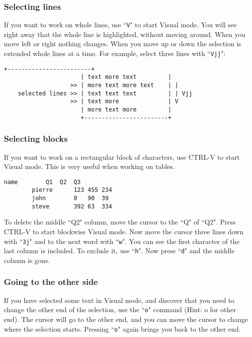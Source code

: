 \subsubsection{Selecting lines}

If you want to work on whole lines, use ``\texttt{V}" to start Visual mode.
You will see right away that the whole line is highlighted, without moving around.
When you move left or right nothing changes.
When you move up or down the selection is extended whole lines at a time.
For example, select three lines with ``\texttt{Vjj}":

\begin{Verbatim}[samepage=true]
                      +------------------------+
                      | text more text         |
                   >> | more text more text    | |
    selected lines >> | text text text         | | Vjj
                   >> | text more              | V
                      | more text more         |
                      +------------------------+
\end{Verbatim}

\subsubsection{Selecting blocks}

If you want to work on a rectangular block of characters, use CTRL-V to start
Visual mode.  This is very useful when working on tables.
\begin{Verbatim}[samepage=true]
        name        Q1  Q2  Q3
        pierre      123 455 234
        john        0   90  39
        steve       392 63  334
\end{Verbatim}

To delete the middle ``Q2" column, move the cursor to the ``Q" of ``Q2".
Press CTRL-V to start blockwise Visual mode.
Now move the cursor three lines down with ``\texttt{3j}" and to the next word with ``\texttt{w}".
You can see the first character of the last column is included.
To exclude it, use ``\texttt{h}".
Now press ``\texttt{d}" and the middle column is gone.

\subsubsection{Going to the other side}

If you have selected some text in Visual mode, and discover that you need to change the other end of the selection, use the ``\texttt{o}" command (Hint: o for other end).
The cursor will go to the other end, and you can move the cursor to change where the selection starts.
Pressing ``\texttt{o}" again brings you back to the other end.

